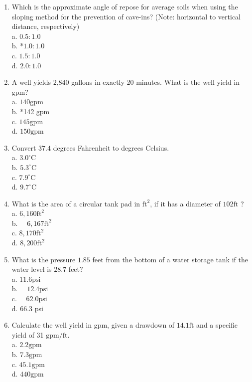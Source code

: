 \documentclass[10pt]{article}
\begin{document}
\begin{enumerate}
  \item Which is the approximate angle of repose for average soils when using the sloping method for the prevention of cave-ins? (Note: horizontal to vertical distance, respectively)\\
a. $0.5: 1.0$\\
b. *$1.0: 1.0$\\
c. $1.5: 1.0$\\
d. $2.0: 1.0$

  \item A well yields 2,840 gallons in exactly 20 minutes. What is the well yield in gpm?\\
a. $140 \mathrm{gpm}$\\
b. *142 gpm\\
c. $145 \mathrm{gpm}$\\
d. $150 \mathrm{gpm}$

  \item Convert $37.4$ degrees Fahrenheit to degrees Celsius.\\
a. $3.0^{\circ} \mathrm{C}$\\
b. $5.3^{\circ} \mathrm{C}$\\
c. $7.9^{\circ} \mathrm{C}$\\
d. $9.7^{\circ} \mathrm{C}$

  \item What is the area of a circular tank pad in $\mathrm{ft}^{2}$, if it has a diameter of $102 \mathrm{ft}$ ?\\
a. $6,160 \mathrm{ft}^{2}$\\
b. $\quad 6,167 \mathrm{ft}^{2}$\\
c. $8,170 \mathrm{ft}^{2}$\\
d. $8,200 \mathrm{ft}^{2}$

  \item What is the pressure $1.85$ feet from the bottom of a water storage tank if the water level is $28.7$ feet?\\
a. $11.6 \mathrm{psi}$\\
b. $\quad 12.4 \mathrm{psi}$\\
c. $\quad 62.0 \mathrm{psi}$\\
d. $66.3$ psi

  \item Calculate the well yield in gpm, given a drawdown of $14.1 \mathrm{ft}$ and a specific yield of 31 $\mathrm{gpm} / \mathrm{ft}$.\\
a. $2.2 \mathrm{gpm}$\\
b. $7.3 \mathrm{gpm}$\\
c. $45.1 \mathrm{gpm}$\\
d. $440 \mathrm{gpm}$


\end{enumerate}
\end{document}
